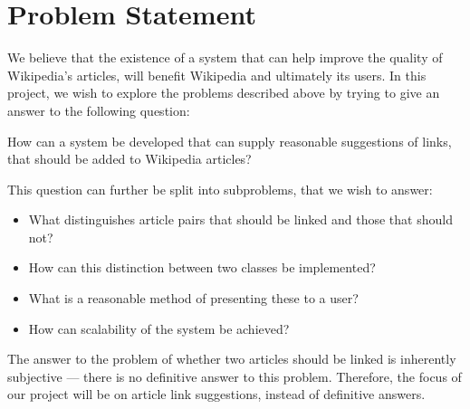 \section{Problem Statement}\label{sec:problem_statement}
We believe that the existence of a system that can help improve the quality of Wikipedia's articles, will benefit Wikipedia and ultimately its users. In this project, we wish to explore the problems described above by trying to give an answer to the following question:

\begin{formal}
How can a system be developed that can supply reasonable suggestions of links, that should be added to Wikipedia articles?
\end{formal}

This question can further be split into subproblems, that we wish to answer:
\begin{itemize}
	\item What distinguishes article pairs that should be linked and those that should not?
  \item How can this distinction between two classes be implemented?
  \item What is a reasonable method of presenting these to a user?
  \item How can scalability of the system be achieved?
\end{itemize}

The answer to the problem of whether two articles should be linked is inherently subjective --- there is no definitive answer to this problem. Therefore, the focus of our project will be on article link suggestions, instead of definitive answers.







